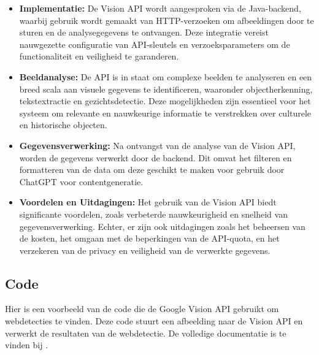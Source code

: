 \begin{itemize}
    \item \textbf{Implementatie:} De Vision API wordt aangesproken via de Java-backend, waarbij gebruik wordt gemaakt van HTTP-verzoeken om afbeeldingen door te sturen en de analysegegevens te ontvangen. Deze integratie vereist nauwgezette configuratie van API-sleutels en verzoeksparameters om de functionaliteit en veiligheid te garanderen.
    
    \item \textbf{Beeldanalyse:} De API is in staat om complexe beelden te analyseren en een breed scala aan visuele gegevens te identificeren, waaronder objectherkenning, tekstextractie en gezichtsdetectie. Deze mogelijkheden zijn essentieel voor het systeem om relevante en nauwkeurige informatie te verstrekken over culturele en historische objecten.
    
    \item \textbf{Gegevensverwerking:} Na ontvangst van de analyse van de Vision API, worden de gegevens verwerkt door de backend. Dit omvat het filteren en formatteren van de data om deze geschikt te maken voor gebruik door ChatGPT voor contentgeneratie.
    
    \item \textbf{Voordelen en Uitdagingen:} Het gebruik van de Vision API biedt significante voordelen, zoals verbeterde nauwkeurigheid en snelheid van gegevensverwerking. Echter, er zijn ook uitdagingen zoals het beheersen van de kosten, het omgaan met de beperkingen van de API-quota, en het verzekeren van de privacy en veiligheid van de verwerkte gegevens.
\end{itemize}
\pagebreak
\subsection{Code}
Hier is een voorbeeld van de code die de Google Vision API gebruikt om webdetecties te vinden. Deze code stuurt een afbeelding naar de Vision API en verwerkt de resultaten van de webdetectie. De volledige documentatie is te vinden bij \autocite{googleVisionAPI}.

